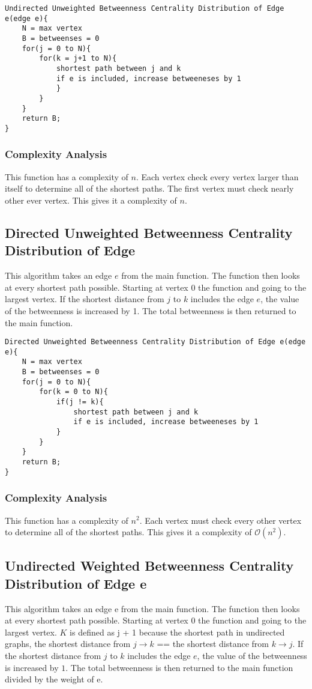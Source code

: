 \documentclass{article}
\begin{document}
\begin{verbatim}
Undirected Unweighted Betweenness Centrality Distribution of Edge e(edge e){
    N = max vertex
    B = betweenses = 0
    for(j = 0 to N){
        for(k = j+1 to N){
            shortest path between j and k
            if e is included, increase betweeneses by 1
            }
        }
    }
    return B;
}
\end{verbatim}

\subsubsection{Complexity Analysis}
This function has a complexity of $n$. Each vertex check every vertex larger than itself to determine all of the shortest paths. The first vertex must check nearly other ever vertex. This gives it a complexity of $n$.

\subsection{Directed Unweighted Betweenness Centrality Distribution of Edge}
This algorithm takes an edge $e$ from the main function. The function then looks at every shortest path possible. Starting at vertex $0$ the function and going to the largest vertex. If the shortest distance from $j$ to $k$ includes the edge $e$, the value of the betweenness is increased by 1. The total betweenness is then returned to the main function.

\begin{verbatim}
Directed Unweighted Betweenness Centrality Distribution of Edge e(edge e){
    N = max vertex
    B = betweenses = 0
    for(j = 0 to N){
        for(k = 0 to N){
            if(j != k){
                shortest path between j and k
                if e is included, increase betweeneses by 1
            }
        }
    }
    return B;
}
\end{verbatim}

\subsubsection{Complexity Analysis}
This function has a complexity of $n^2$. Each vertex must check every other vertex to determine
all of the shortest paths. This gives it a complexity of $\mathcal{O}(n^2)$.

\subsection{Undirected Weighted Betweenness Centrality Distribution of Edge e}
This algorithm takes an edge e from the main function. The function then looks at every shortest path possible. Starting at vertex $0$ the function and going to the largest vertex. $K$ is defined as j + 1 because the shortest path in undirected graphs, the shortest distance from $j \rightarrow k$ == the shortest distance from $k \rightarrow j$. If the shortest distance from $j$ to $k$ includes the edge $e$, the value of the betweenness is increased by $1$. The total betweenness is then returned to the main function divided by the weight of e.
\end{document}
